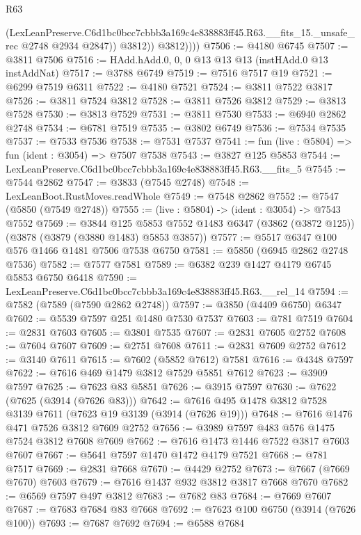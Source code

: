 \begin{lexlean}{R63}
\begin{coremodule}
                  (LexLeanPreserve.C6d1bc0bcc7cbbb3a169c4e838883ff45.R63.__fits_15._unsafe_rec
                    @2748
                    @2934
                    @2847))
                @3812))
            @3812))))
@7506 := @4180 @6745
@7507 := @3811 @7506
@7516 := HAdd.hAdd.{0, 0, 0} @13 @13 @13 (instHAdd.{0} @13 instAddNat)
@7517 := @3788 @6749
@7519 := @7516 @7517 @19
@7521 := @6299 @7519 @6311
@7522 := @4180 @7521
@7524 := @3811 @7522 @3817
@7526 := @3811 @7524 @3812
@7528 := @3811 @7526 @3812
@7529 := @3813 @7528
@7530 := @3813 @7529
@7531 := @3811 @7530
@7533 := @6940 @2862 @2748
@7534 := @6781 @7519
@7535 := @3802 @6749
@7536 := @7534 @7535
@7537 := @7533 @7536
@7538 := @7531 @7537
@7541 := fun (live : @5804) => fun (ident : @3054) => @7507 @7538
@7543 := @3827 @125 @5853
@7544 := LexLeanPreserve.C6d1bc0bcc7cbbb3a169c4e838883ff45.R63.__fits_5
@7545 := @7544 @2862
@7547 := @3833 (@7545 @2748)
@7548 := LexLeanBoot.RustMoves.readWhole
@7549 := @7548 @2862
@7552 := @7547 (@5850 (@7549 @2748))
@7555 := (live : @5804) -> (ident : @3054) -> @7543 @7552
@7569 := @3844
    @125
    @5853
    @7552
    @1483
    @6347
    (@3862 (@3872 @125))
    (@3878 (@3879 (@3880 @1483) @5853 @3857))
@7577 := @5517 @6347 @100 @576 @1466 @1481 @7506 @7538 @6750
@7581 := @5850 (@6945 @2862 @2748 @7536)
@7582 := @7577 @7581
@7589 := @6382 @239 @1427 @4179 @6745 @5853 @6750 @6418
@7590 := LexLeanPreserve.C6d1bc0bcc7cbbb3a169c4e838883ff45.R63.__rel_14
@7594 := @7582 (@7589 (@7590 @2862 @2748))
@7597 := @3850 (@4409 @6750) @6347
@7602 := @5539 @7597 @251 @1480 @7530 @7537
@7603 := @781 @7519
@7604 := @2831 @7603
@7605 := @3801 @7535
@7607 := @2831 @7605 @2752
@7608 := @7604 @7607
@7609 := @2751 @7608
@7611 := @2831 @7609 @2752
@7612 := @3140 @7611
@7615 := @7602 (@5852 @7612) @7581
@7616 := @4348 @7597
@7622 := @7616 @469 @1479 @3812 @7529 @5851 @7612
@7623 := @3909 @7597
@7625 := @7623 @83 @5851
@7626 := @3915 @7597
@7630 := @7622 (@7625 (@3914 (@7626 @83)))
@7642 := @7616 @495 @1478 @3812 @7528 @3139 @7611 (@7623 @19 @3139 (@3914 (@7626 @19)))
@7648 := @7616 @1476 @471 @7526 @3812 @7609 @2752
@7656 := @3989 @7597 @483 @576 @1475 @7524 @3812 @7608 @7609
@7662 := @7616 @1473 @1446 @7522 @3817 @7603 @7607
@7667 := @5641 @7597 @1470 @1472 @4179 @7521
@7668 := @781 @7517
@7669 := @2831 @7668
@7670 := @4429 @2752
@7673 := @7667 (@7669 @7670) @7603
@7679 := @7616 @1437 @932 @3812 @3817 @7668 @7670
@7682 := @6569 @7597 @497 @3812
@7683 := @7682 @83
@7684 := @7669 @7607
@7687 := @7683 @7684 @83 @7668
@7692 := @7623 @100 @6750 (@3914 (@7626 @100))
@7693 := @7687 @7692
@7694 := @6588 @7684

\end{coremodule}
\end{lexlean}
